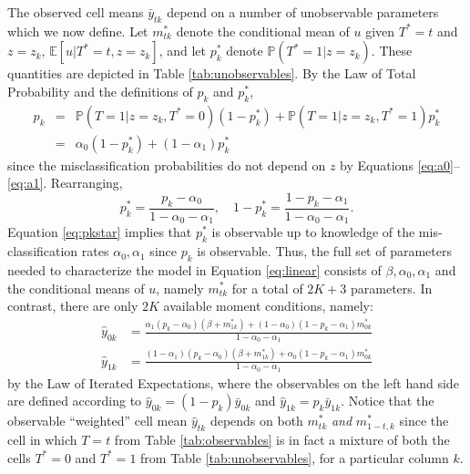 The observed cell means $\bar{y}_{tk}$ depend on a number of unobservable parameters which we now define. 
Let $m^*_{tk}$ denote the conditional mean of $u$ given $T^*=t$ and $z=z_k$, $\mathbb{E}[u|T^*=t, z=z_k]$, and let $p^*_k$ denote $\mathbb{P}(T^*=1|z=z_k)$.
These quantities are depicted in Table \ref{tab:unobservables}.
By the Law of Total Probability and the definitions of $p_k$ and $p_k^*$,
\begin{eqnarray*}
  p_k &=&  \mathbb{P}(T=1|z=z_k,T^*=0)(1-p^*_{k}) + \mathbb{P}(T=1|z=z_k,T^*=1)p^*_k \\
  &=& \alpha_0 (1-p^*_k) + (1 - \alpha_1) p_k^* 
\end{eqnarray*}
since the misclassification probabilities do not depend on $z$ by Equations \ref{eq:a0}--\ref{eq:a1}.
Rearranging, 
\begin{equation}
  p_k^* = \frac{p_k - \alpha_0}{1 - \alpha_0 - \alpha_1}, \quad
  1 -p_k^* = \frac{1 - p_k - \alpha_1}{1 - \alpha_0 - \alpha_1}. 
  \label{eq:pkstar}
\end{equation}
Equation \ref{eq:pkstar} implies that $p_k^*$ is observable up to knowledge of the mis-classification rates $\alpha_0,\alpha_1$ since $p_k$ is observable.
Thus, the full set of parameters needed to characterize the model in Equation \ref{eq:linear} consists of $\beta, \alpha_0, \alpha_1$ and the conditional means of $u$, namely $m^*_{tk}$ for a total of $2K+3$ parameters.
In contrast, there are only $2K$ available moment conditions, namely:
\begin{align}
  \label{eq:MC0}
  \hat{y}_{0k} &=\frac{\alpha_1(p_k - \alpha_0)(\beta + m_{1k}^*) + (1 - \alpha_0)(1 - p _k -  \alpha_1)m_{0k}^*}{1 - \alpha_0 - \alpha_1} \\[1.5ex]
  \label{eq:MC1}
  \hat{y}_{1k} &= \frac{(1-\alpha_1)(p_k - \alpha_0)(\beta+m_{1k}^*)+  \alpha_0(1-p_k - \alpha_1)m_{0k}^*}{1-\alpha_0 - \alpha_1}
\end{align}
by the Law of Iterated Expectations, where the observables on the left hand side are defined according to $\hat{y}_{0k} = (1-p_k)\bar{y}_{0k}$ and $\hat{y}_{1k}= p_k \bar{y}_{1k}$.
Notice that the observable ``weighted'' cell mean $\hat{y}_{tk}$ depends on both $m^*_{tk}$ \emph{and} $m^*_{1-t,k}$ since the cell in which $T=t$ from Table \ref{tab:observables} is in fact a mixture of both the cells $T^*=0$ and $T^*=1$ from Table \ref{tab:unobservables}, for a particular column $k$.


